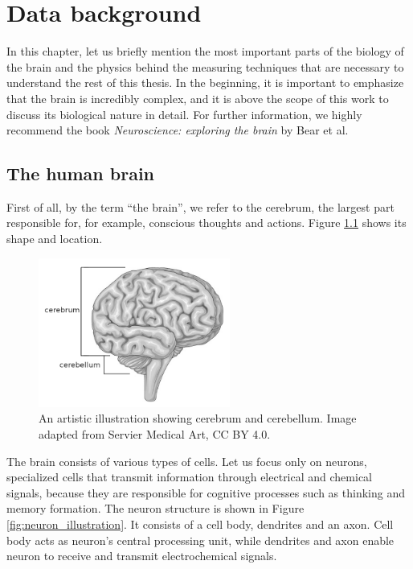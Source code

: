\chapter{Data background}

In this chapter, let us briefly mention the most important parts of the biology of the brain and the physics behind the measuring techniques that are necessary to understand the rest of this thesis. In the beginning, it is important to emphasize that the brain is incredibly complex, and it is above the scope of this work to discuss its biological nature in detail. For further information, we highly recommend the book \textit{Neuroscience: exploring the brain} by Bear et al. \cite{bear_neuroscience_2016}

\section{The human brain}

First of all, by the term \enquote{the brain}, we refer to the cerebrum, the largest part responsible for, for example, conscious thoughts and actions. Figure \ref{fig:brain_cerebrum_illustration} shows its shape and location.

\begin{figure}
  \begin{center}
    \includegraphics[width=6.3cm]{images/brain/brain_cerebrum_cerebellum_II.png}
  \end{center}
  \caption[An artistic illustration showing cerebrum and cerebellum]{An artistic illustration showing cerebrum and cerebellum. Image adapted from Servier Medical Art, CC BY 4.0.}
  \label{fig:brain_cerebrum_illustration}
\end{figure}

The brain consists of various types of cells. Let us focus only on neurons, specialized cells that transmit information through electrical and chemical signals, because they are responsible for cognitive processes such as thinking and memory formation. The neuron structure is shown in Figure \ref{fig:neuron_illustration}. It consists of a cell body, dendrites and an axon. Cell body acts as neuron's central processing unit, while dendrites and axon enable neuron to receive and transmit electrochemical signals. 

